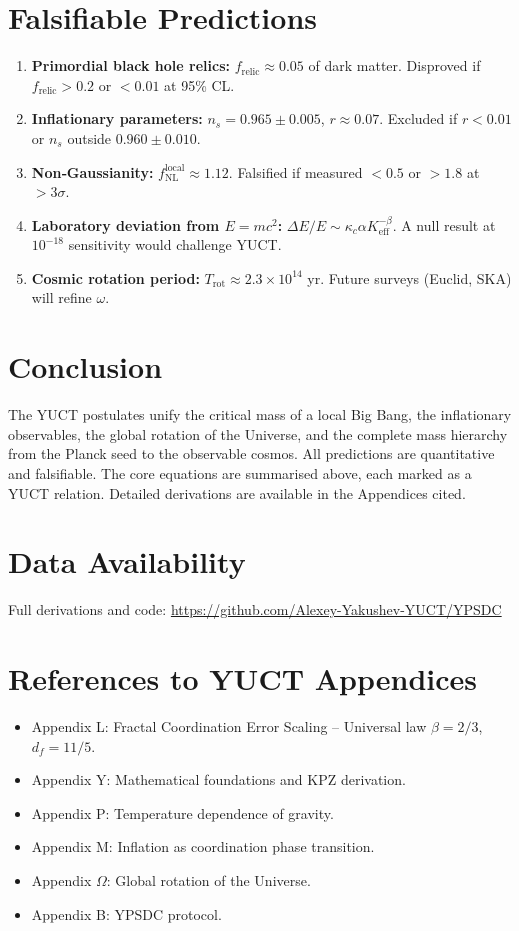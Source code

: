 \documentclass[12pt,a4paper]{article}
\begin{document}
	\section{Falsifiable Predictions}
	
	\begin{enumerate}
		\item \textbf{Primordial black hole relics:} \(f_{\mathrm{relic}} \approx 0.05\) of dark matter. Disproved if \(f_{\mathrm{relic}}>0.2\) or \(<0.01\) at 95\% CL.
		\item \textbf{Inflationary parameters:} \(n_s = 0.965\pm0.005\), \(r\approx 0.07\). Excluded if \(r<0.01\) or \(n_s\) outside \(0.960\pm0.010\).
		\item \textbf{Non‑Gaussianity:} \(f_{\mathrm{NL}}^{\mathrm{local}} \approx 1.12\). Falsified if measured \(<0.5\) or \(>1.8\) at \(>3\sigma\).
		\item \textbf{Laboratory deviation from \(E=mc^2\):} \(\Delta E/E \sim \kappa_c\alpha K_{\mathrm{eff}}^{-\beta}\). A null result at \(10^{-18}\) sensitivity would challenge YUCT.
		\item \textbf{Cosmic rotation period:} \(T_{\mathrm{rot}} \approx 2.3\times10^{14}\) yr. Future surveys (Euclid, SKA) will refine \(\omega\).
	\end{enumerate}
	
	\section{Conclusion}
	
	The YUCT postulates unify the critical mass of a local Big Bang, the inflationary observables, the global rotation of the Universe, and the complete mass hierarchy from the Planck seed to the observable cosmos. All predictions are quantitative and falsifiable. The core equations are summarised above, each marked as a YUCT relation. Detailed derivations are available in the Appendices cited.
	
	\section*{Data Availability}
	
	Full derivations and code: \url{https://github.com/Alexey-Yakushev-YUCT/YPSDC}
	
	\section*{References to YUCT Appendices}
	\begin{itemize}
		\item Appendix L: Fractal Coordination Error Scaling – Universal law \(\beta=2/3\), \(d_f=11/5\).
		\item Appendix Y: Mathematical foundations and KPZ derivation.
		\item Appendix P: Temperature dependence of gravity.
		\item Appendix M: Inflation as coordination phase transition.
		\item Appendix \(\Omega\): Global rotation of the Universe.
		\item Appendix B: YPSDC protocol.
	\end{itemize}
	
\end{document}
